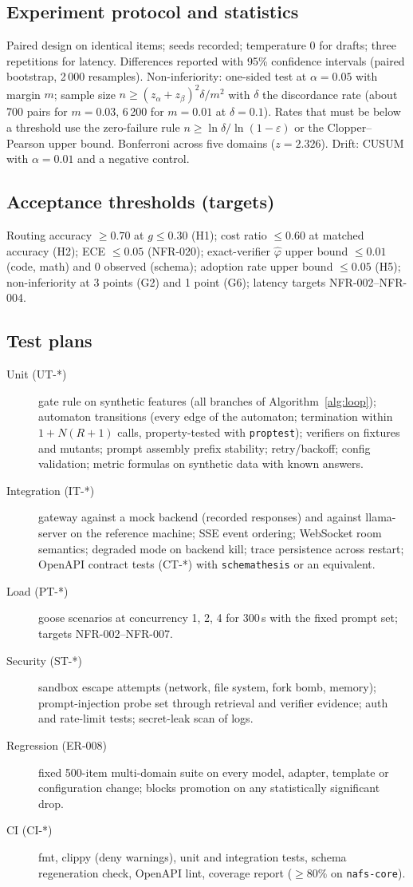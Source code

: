 \documentclass[11pt,a4paper]{article}
\begin{document}
\subsection{Experiment protocol and statistics}
Paired design on identical items; seeds recorded; temperature 0 for drafts; three repetitions for latency. Differences reported with 95\% confidence intervals (paired bootstrap, 2\,000 resamples). Non-inferiority: one-sided test at $\alpha=0.05$ with margin $m$; sample size $n\ge(z_\alpha+z_\beta)^2\delta/m^2$ with $\delta$ the discordance rate (about 700 pairs for $m=0.03$, 6\,200 for $m=0.01$ at $\delta=0.1$). Rates that must be below a threshold use the zero-failure rule $n\ge\ln\delta/\ln(1-\varepsilon)$ or the Clopper--Pearson upper bound. Bonferroni across five domains ($z=2.326$). Drift: CUSUM with $\alpha=0.01$ and a negative control.
\subsection{Acceptance thresholds (targets)}
Routing accuracy $\ge0.70$ at $g\le0.30$ (H1); cost ratio $\le0.60$ at matched accuracy (H2); ECE $\le0.05$ (NFR-020); exact-verifier $\hat\varphi$ upper bound $\le0.01$ (code, math) and $0$ observed (schema); adoption rate upper bound $\le0.05$ (H5); non-inferiority at 3 points (G2) and 1 point (G6); latency targets NFR-002--NFR-004.
\subsection{Test plans}
\begin{description}
\item[Unit (UT-*)] gate rule on synthetic features (all branches of Algorithm~\ref{alg:loop}); automaton transitions (every edge of the automaton; termination within $1+N(R+1)$ calls, property-tested with \texttt{proptest}); verifiers on fixtures and mutants; prompt assembly prefix stability; retry/backoff; config validation; metric formulas on synthetic data with known answers.
\item[Integration (IT-*)] gateway against a mock backend (recorded responses) and against llama-server on the reference machine; SSE event ordering; WebSocket room semantics; degraded mode on backend kill; trace persistence across restart; OpenAPI contract tests (CT-*) with \texttt{schemathesis} or an equivalent.
\item[Load (PT-*)] goose scenarios at concurrency 1, 2, 4 for 300\,s with the fixed prompt set; targets NFR-002--NFR-007.
\item[Security (ST-*)] sandbox escape attempts (network, file system, fork bomb, memory); prompt-injection probe set through retrieval and verifier evidence; auth and rate-limit tests; secret-leak scan of logs.
\item[Regression (ER-008)] fixed 500-item multi-domain suite on every model, adapter, template or configuration change; blocks promotion on any statistically significant drop.
\item[CI (CI-*)] fmt, clippy (deny warnings), unit and integration tests, schema regeneration check, OpenAPI lint, coverage report ($\ge80\%$ on \texttt{nafs-core}).
\end{description}
\end{document}
